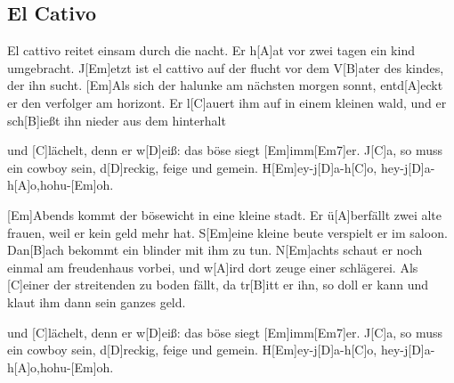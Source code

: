 \subsection*{El Cativo   }
\begin{guitar}
[Em]El cattivo reitet einsam durch die nacht.
Er h[A]at vor zwei tagen ein kind umgebracht.
J[Em]etzt ist el cattivo auf der flucht
vor dem V[B]ater des kindes, der ihn sucht.
[Em]Als sich der halunke am nächsten morgen sonnt,
entd[A]eckt er den verfolger am horizont.
Er l[C]auert ihm auf in einem kleinen wald,
und er sch[B]ießt ihn nieder aus dem hinterhalt




und [C]lächelt, denn er w[D]eiß: das böse siegt [Em]imm[Em7]er.
J[C]a, so muss ein cowboy sein, d[D]reckig, feige und gemein.
H[Em]ey-j[D]a-h[C]o, hey-j[D]a-h[A]o,hohu-[Em]oh.




[Em]Abends kommt der bösewicht in eine kleine stadt.
Er ü[A]berfällt zwei alte frauen, weil er kein geld mehr hat.
S[Em]eine kleine beute verspielt er im saloon.
Dan[B]ach bekommt ein blinder mit ihm zu tun.
N[Em]achts schaut er noch einmal am freudenhaus vorbei,
und w[A]ird dort zeuge einer schlägerei.
Als [C]einer der streitenden zu boden fällt,
da tr[B]itt er ihn, so doll er kann und klaut ihm dann sein ganzes geld.



und [C]lächelt, denn er w[D]eiß: das böse siegt [Em]imm[Em7]er.
J[C]a, so muss ein cowboy sein, d[D]reckig, feige und gemein.
H[Em]ey-j[D]a-h[C]o, hey-j[D]a-h[A]o,hohu-[Em]oh.
\end{guitar}
